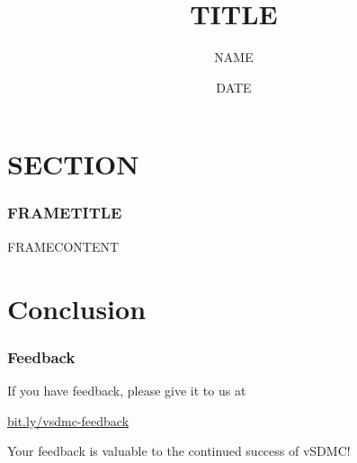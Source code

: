 \documentclass[mathserif]{beamer}
\title[SHORTTITLE]{TITLE}
\author{NAME}
\date{DATE}
\begin{document}
\frame{\titlepage}

\section{SECTION}

\begin{frame}\frametitle{FRAMETITLE}
	FRAMECONTENT
\end{frame}

\section{Conclusion}

\begin{frame}\frametitle{Feedback}
	If you have feedback, please give it to us at
	\begin{center}
		\url{bit.ly/vsdmc-feedback}
	\end{center}
	Your feedback is valuable to the continued success of vSDMC!
\end{frame}
\end{document}
